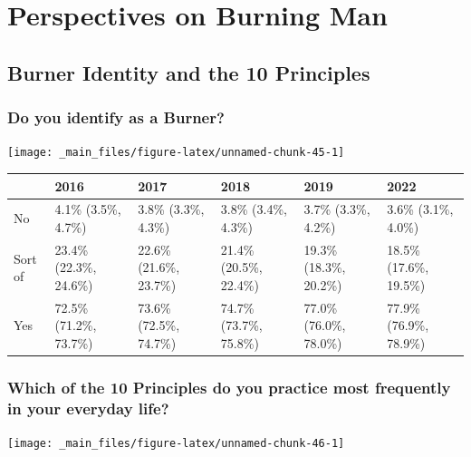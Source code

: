 \documentclass[
]{book}
\begin{document}
\hypertarget{perspectives-on-burning-man}{%
\chapter{Perspectives on Burning Man}\label{perspectives-on-burning-man}}

\hypertarget{burner-identity-and-the-10-principles}{%
\section{Burner Identity and the 10 Principles}\label{burner-identity-and-the-10-principles}}

\hypertarget{do-you-identify-as-a-burner}{%
\subsection{Do you identify as a Burner?}\label{do-you-identify-as-a-burner}}

\texttt{[image: \_main\_files/figure-latex/unnamed-chunk-45-1]}

\begin{table}
\centering
\begin{tabular}[t]{>{}l|>{}l|>{}l|>{}l|>{}l|>{}l}
\hline
  & 2016 & 2017 & 2018 & 2019 & 2022\\
\hline
No & 4.1\% (3.5\%, 4.7\%) & 3.8\% (3.3\%, 4.3\%) & 3.8\% (3.4\%, 4.3\%) & 3.7\% (3.3\%, 4.2\%) & 3.6\% (3.1\%, 4.0\%)\\
\hline
Sort of & 23.4\% (22.3\%, 24.6\%) & 22.6\% (21.6\%, 23.7\%) & 21.4\% (20.5\%, 22.4\%) & 19.3\% (18.3\%, 20.2\%) & 18.5\% (17.6\%, 19.5\%)\\
\hline
Yes & 72.5\% (71.2\%, 73.7\%) & 73.6\% (72.5\%, 74.7\%) & 74.7\% (73.7\%, 75.8\%) & 77.0\% (76.0\%, 78.0\%) & 77.9\% (76.9\%, 78.9\%)\\
\hline
\end{tabular}
\end{table}

\hypertarget{which-of-the-10-principles-do-you-practice-most-frequently-in-your-everyday-life}{%
\subsection{Which of the 10 Principles do you practice most frequently in your everyday life?}\label{which-of-the-10-principles-do-you-practice-most-frequently-in-your-everyday-life}}

\texttt{[image: \_main\_files/figure-latex/unnamed-chunk-46-1]}
\end{document}
